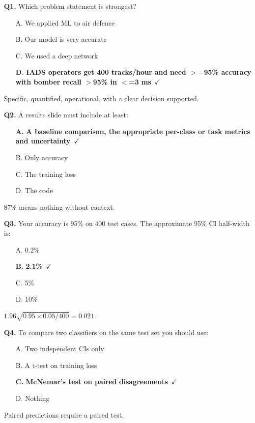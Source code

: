 \documentclass[11pt]{article}
\begin{document}
{\small

\noindent\textbf{Q1.} Which problem statement is strongest?\begin{itemize}[leftmargin=2.2em,itemsep=0pt,topsep=1pt]\item[A.] We applied ML to air defence\item[B.] Our model is very accurate\item[C.] We used a deep network\item[\textbf{D.}] \textbf{IADS operators get 400 tracks/hour and need $>$=95\% accuracy with bomber recall $>$95\% in $<$=3 ms}~{\color{GrnN}$\checkmark$}\end{itemize} Specific, quantified, operational, with a clear decision supported.\par\medskip

\noindent\textbf{Q2.} A results slide must include at least:\begin{itemize}[leftmargin=2.2em,itemsep=0pt,topsep=1pt]\item[\textbf{A.}] \textbf{A baseline comparison, the appropriate per-class or task metrics and uncertainty}~{\color{GrnN}$\checkmark$}\item[B.] Only accuracy\item[C.] The training loss\item[D.] The code\end{itemize} 87\% means nothing without context.\par\medskip

\noindent\textbf{Q3.} Your accuracy is 95\% on 400 test cases. The approximate 95\% CI half-width is:\begin{itemize}[leftmargin=2.2em,itemsep=0pt,topsep=1pt]\item[A.] 0.2\%\item[\textbf{B.}] \textbf{2.1\%}~{\color{GrnN}$\checkmark$}\item[C.] 5\%\item[D.] 10\%\end{itemize} $1.96\sqrt{0.95\times0.05/400}=0.021$.\par\medskip

\noindent\textbf{Q4.} To compare two classifiers on the same test set you should use:\begin{itemize}[leftmargin=2.2em,itemsep=0pt,topsep=1pt]\item[A.] Two independent CIs only\item[B.] A t-test on training loss\item[\textbf{C.}] \textbf{McNemar's test on paired disagreements}~{\color{GrnN}$\checkmark$}\item[D.] Nothing\end{itemize} Paired predictions require a paired test.\par\medskip

}
\end{document}
